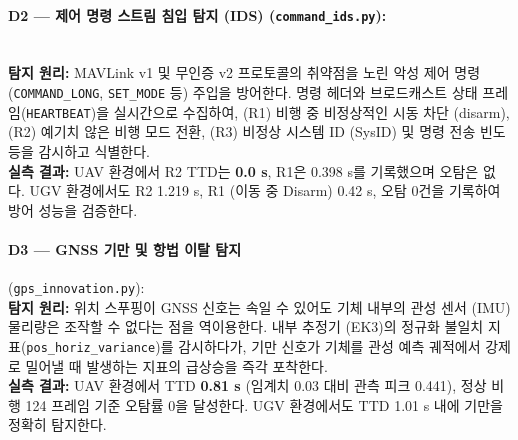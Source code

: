 \paragraph{\textbf{D2 --- 제어 명령 스트림 침입 탐지 (IDS)} (\texttt{command\_ids.py}):} ~\\
\textbf{탐지 원리:} MAVLink v1 및 무인증 v2 프로토콜의 취약점을 노린 악성 제어 명령 (\texttt{COMMAND\_LONG}, \texttt{SET\_MODE} 등) 주입을 방어한다. 명령 헤더와 브로드캐스트 상태 프레임(\texttt{HEARTBEAT})을 실시간으로 수집하여, (R1) 비행 중 비정상적인 시동 차단 (disarm), (R2) 예기치 않은 비행 모드 전환, (R3) 비정상 시스템 ID (SysID) 및 명령 전송 빈도 등을 감시하고 식별한다.\\
\textbf{실측 결과:} UAV 환경에서 R2 TTD는 \textbf{0.0 s}, R1은 0.398 s를 기록했으며 오탐은 없다. UGV 환경에서도 R2 1.219 s, R1 (이동 중 Disarm) 0.42 s, 오탐 0건을 기록하여 방어 성능을 검증한다.


\paragraph{\textbf{D3 --- GNSS 기만 및 항법 이탈 탐지}} (\texttt{gps\_innovation.py}): ~\\
\textbf{탐지 원리:} 위치 스푸핑이 GNSS 신호는 속일 수 있어도 기체 내부의 관성 센서 (IMU) 물리량은 조작할 수 없다는 점을 역이용한다. 내부 추정기 (EK3)의 정규화 불일치 지표(\texttt{pos\_horiz\_variance})를 감시하다가, 기만 신호가 기체를 관성 예측 궤적에서 강제로 밀어낼 때 발생하는 지표의 급상승을 즉각 포착한다.\\
\textbf{실측 결과:} UAV 환경에서 TTD \textbf{0.81 s} (임계치 0.03 대비 관측 피크 0.441), 정상 비행 124 프레임 기준 오탐률 0을 달성한다. UGV 환경에서도 TTD 1.01 s 내에 기만을 정확히 탐지한다.

